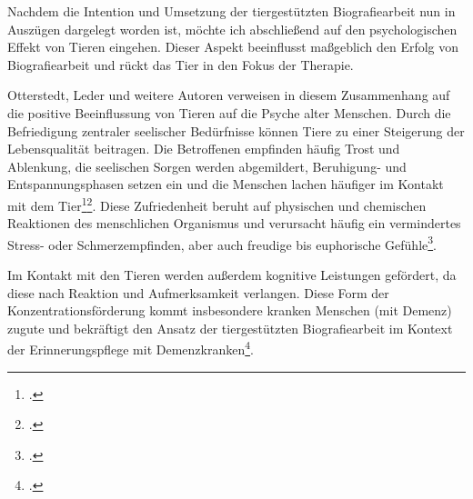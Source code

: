 Nachdem die Intention und Umsetzung der tiergestützten Biografiearbeit nun in Auszügen dargelegt worden ist, möchte ich abschließend auf den psychologischen Effekt von Tieren eingehen. Dieser Aspekt beeinflusst maßgeblich den Erfolg von Biografiearbeit und rückt das Tier in den Fokus der Therapie.

Otterstedt, Leder und weitere Autoren verweisen in diesem Zusammenhang auf die positive Beeinflussung von Tieren auf die Psyche alter Menschen. Durch die Befriedigung zentraler seelischer Bedürfnisse können Tiere zu einer Steigerung der Lebensqualität beitragen. Die Betroffenen empfinden häufig Trost und Ablenkung, die seelischen Sorgen werden abgemildert, Beruhigung- und Entspannungsphasen setzen ein und die Menschen lachen häufiger im Kontakt mit dem Tier\footcite[vgl.][27f]{Otterstedt2001}\footcite[vgl.][75]{Leder2006}. Diese Zufriedenheit beruht auf physischen und chemischen Reaktionen des menschlichen Organismus und verursacht häufig ein vermindertes Stress- oder Schmerzempfinden, aber auch freudige bis euphorische Gefühle\footcite[vgl.][75]{Leder2006}. 

Im Kontakt mit den Tieren werden außerdem kognitive Leistungen gefördert, da diese nach Reaktion und Aufmerksamkeit verlangen. Diese Form der Konzentrationsförderung kommt insbesondere kranken Menschen (mit Demenz) zugute und bekräftigt den Ansatz der tiergestützten Biografiearbeit im Kontext der Erinnerungspflege mit Demenzkranken\footcite[vgl.][76]{Leder2006}.
